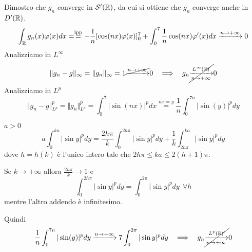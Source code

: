 Dimostro che $g_{n}$ converge in $\mathcal{S} '(\mathbb{R})$, da cui si ottiene che $g_{n}$ converge anche in $D'(\mathbb{R})$.
\begin{equation*}
\int_{\mathbb{R}} g_{n}(x) \varphi (x) dx = \overset{\text{ipp}}{=} - \frac{1}{n}[\cos(nx) \varphi (x)]^{7}_{0} + \int^{7}_{0}\frac{1}{n}\cos(nx) \varphi '(x) dx\xrightarrow{n\rightarrow + \infty} 0
\end{equation*}
Analizziamo in $L^{\infty}$
\begin{equation*}
\Vert g_{n} - g\Vert_{\infty} = \Vert g_{n}\Vert_{\infty} = 1\cancel{\xrightarrow{n\rightarrow + \infty}} 0\ \ \implies \ \ g_{n}\cancel{\xrightarrow[n\rightarrow + \infty ]{L^{\infty}(\RR)}} 0
\end{equation*}
Analizziamo in $L^{p}$
\begin{equation*}
\Vert g_{n} - g\Vert^{p}_{L^{p}} = \Vert g_{n}\Vert^{p}_{L^{p}} = \int^{7}_{0}| \sin(nx)|^{p} dx\overset{nx = y}{=}\frac{1}{n}\int^{7n}_{0}| \sin(y)|^{p} dy
\end{equation*}
\begin{rem}
$a > 0$
\begin{equation*}
a\int^{ka}_{0}| \sin y|^{p} dy = \frac{2h\pi}{k}\int^{2h\pi}_{0}| \sin y|^{p} dy + \frac{1}{k}\int^{ka}_{2h\pi}| \sin y|^{p} dy
\end{equation*}
dove $h = h(k)$ è l'unico intero tale che $2h\pi \leq ka \leq 2(h + 1) \pi $.

Se $k\rightarrow + \infty $ allora $\frac{2h\pi}{k}\rightarrow 1$ e
\begin{equation*}
\int^{2h\pi}_{0}| \sin y|^{p} dy = \int^{2\pi}_{0}| \sin y|^{p} dy\ \ \forall h
\end{equation*}
mentre l'altro addendo è infinitesimo.
\end{rem}
Quindi
\begin{equation*}
\frac{1}{n}\int^{7n}_{0}| \sin(y)|^{p} dy\xrightarrow{n\rightarrow + \infty} 7\int^{2\pi}_{0}| \sin y|^{p} dy\ \ \implies \ \ g_{n}\cancel{\xrightarrow[n\rightarrow + \infty ]{L^{p}(\mathbb{R})}} 0
\end{equation*}
\Soluzione
